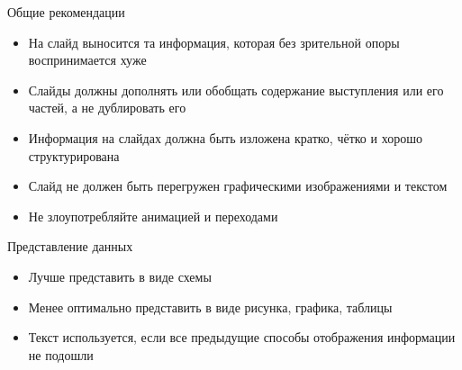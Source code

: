 \documentclass[
  ignorenonframetext,
  aspectratio=169,
]{beamer}
\providecommand{\tightlist}{%
  \setlength{\itemsep}{0pt}\setlength{\parskip}{0pt}}\usepackage{longtable,booktabs,array}
\begin{document}
\begin{frame}{Общие рекомендации}
\label{ux43eux431ux449ux438ux435-ux440ux435ux43aux43eux43cux435ux43dux434ux430ux446ux438ux438}
\begin{itemize}[<+->]
\tightlist
\item
  На слайд выносится та информация, которая без зрительной опоры
  воспринимается хуже
\item
  Слайды должны дополнять или обобщать содержание выступления или его
  частей, а не дублировать его
\item
  Информация на слайдах должна быть изложена кратко, чётко и хорошо
  структурирована
\item
  Слайд не должен быть перегружен графическими изображениями и текстом
\item
  Не злоупотребляйте анимацией и переходами
\end{itemize}
\end{frame}

\begin{frame}{Представление данных}
\label{ux43fux440ux435ux434ux441ux442ux430ux432ux43bux435ux43dux438ux435-ux434ux430ux43dux43dux44bux445}
\begin{itemize}[<+->]
\tightlist
\item
  Лучше представить в виде схемы
\item
  Менее оптимально представить в виде рисунка, графика, таблицы
\item
  Текст используется, если все предыдущие способы отображения информации
  не подошли
\end{itemize}
\end{frame}
\end{document}

